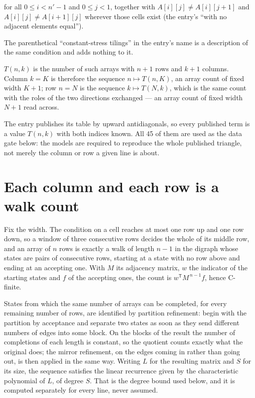 \documentclass[11pt]{article}
\theoremstyle{definition}
\begin{document}
for all $0 \le i < n'-1$ and $0 \le j < 1$, together with $A[i][j] \ne A[i][j{+}1]$ and $A[i][j] \ne A[i{+}1][j]$ wherever those cells exist (the entry's ``with no adjacent elements equal'').

The parenthetical ``constant-stress tilings'' in the entry's name is a description of the same condition and adds nothing to it.

$T(n,k)$ is the number of such arrays with $n + 1$ rows and $k + 1$ columns. Column $k = K$ is therefore the sequence $n \mapsto T(n,K)$, an array count of fixed width $K + 1$; row $n = N$ is the sequence $k \mapsto T(N,k)$, which is the same count with the roles of the two directions exchanged --- an array count of fixed width $N + 1$ read across.

The entry publishes its table by upward antidiagonals, so every published term is a value $T(n,k)$ with both indices known. All 45 of them are used as the data gate below: the models are required to reproduce the whole published triangle, not merely the column or row a given line is about.

\section{Each column and each row is a walk count}

Fix the width. The condition on a cell reaches at most one row up and one row down, so a window of three consecutive rows decides the whole of its middle row, and an array of $n$ rows is exactly a walk of length $n-1$ in the digraph whose states are pairs of consecutive rows, starting at a state with no row above and ending at an accepting one. With $M$ its adjacency matrix, $w$ the indicator of the starting states and $f$ of the accepting ones, the count is $w^{\mathsf T}M^{\,n-1}f$, hence C-finite.

States from which the same number of arrays can be completed, for every remaining number of rows, are identified by partition refinement: begin with the partition by acceptance and separate two states as soon as they send different numbers of edges into some block. On the blocks of the result the number of completions of each length is constant, so the quotient counts exactly what the original does; the mirror refinement, on the edges coming in rather than going out, is then applied in the same way. Writing $L$ for the resulting matrix and $S$ for its size, the sequence satisfies the linear recurrence given by the characteristic polynomial of $L$, of degree $S$. That is the degree bound used below, and it is computed separately for every line, never assumed.
\end{document}

